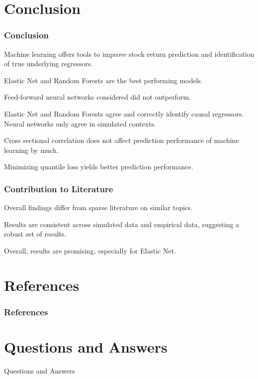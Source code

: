 \documentclass[aspectratio=169]{beamer}
\begin{document}
\section{Conclusion}
\begin{frame}
\frametitle{Conclusion}

Machine learning offers tools to improve stock return prediction and identification of true underlying regressors. 

Elastic Net and Random Forests are the best performing models.

Feed-forward neural networks considered did not outperform.

Elastic Net and Random Forests agree and correctly identify causal regressors. Neural networks only agree in simulated contexts. 

Cross sectional correlation does not affect prediction performance of machine learning by much.

Minimizing quantile loss yields better prediction performance.
\end{frame}

\begin{frame}
\frametitle{Contribution to Literature}
Overall findings differ from sparse literature on similar topics.

Results are consistent across simulated data and empirical data, suggesting a robust set of results.

Overall, results are promising, especially for Elastic Net.
\end{frame}

\section{References}
\begin{frame}
\frametitle{References}


\end{frame}

\section{Questions and Answers}

\begin{frame}
\begin{center}
\huge Questions and Answers
\end{center}
\end{frame}
\end{document}
